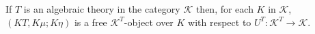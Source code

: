 If $T$ is an algebraic theory in the category $\mathcal{K}$ then, for each $K$ in $\mathcal{K}$, $(KT, K\mu; K\eta)$ is a free $\mathcal{K}^T$-object over $K$ with respect to $U^T: \mathcal{K}^T \longrightarrow \mathcal{K}$.
